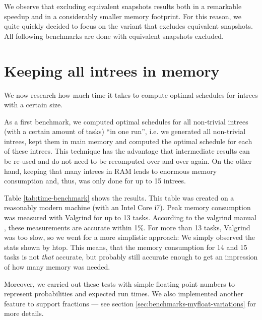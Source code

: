 We observe that excluding equivalent snapshots results both in a remarkable speedup and in a considerably smaller memory footprint. For this reason, we quite quickly decided to focus on the variant that excludes equivalent snapshots. All following benchmarks are done with equivalent snapshots excluded.

\section{Keeping all intrees in memory}
\label{sec:benchmarks-all-intrees-in-memory}

We now research how much time it takes to compute optimal schedules for intrees with a certain size.

As a first benchmark, we computed optimal schedules for all non-trivial intrees (with a certain amount of tasks) ``in one run'', i.e. we generated all non-trivial intrees, kept them in main memory and computed the optimal schedule for each of these intrees. This technique has the advantage that intermediate results can be re-used and do not need to be recomputed over and over again. On the other hand, keeping that many intrees in RAM leads to enormous memory consumption and, thus, was only done for up to 15 intrees.

Table \ref{tab:time-benchmark} shows the results. This table was created on a reasonably modern machine (with an Intel Core i7). Peak memory consumption was measured with Valgrind for up to 13 tasks. According to the valgrind manual \cite{massifmanual}, these measurements are accurate within 1\%. For more than 13 tasks, Valgrind was too slow, so we went for a more simplistic approach: We simply observed the stats shown by htop. This means, that the memory consumption for 14 and 15 tasks is not \emph{that} accurate, but probably still accurate enough to get an impression of how many memory was needed.

Moreover, we carried out these tests with simple floating point numbers to represent probabilities and expected run times. We also implemented another feature to support fractions --- see section \ref{sec:benchmarks-myfloat-variations} for more details.

